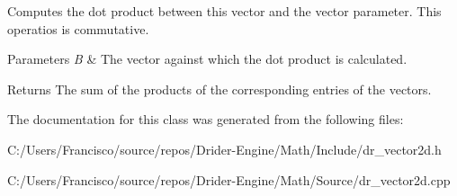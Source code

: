Computes the dot product between this vector and the vector parameter. This operatios is commutative.


\begin{DoxyParams}{Parameters}
{\em B} & The vector against which the dot product is calculated.\\
\hline
\end{DoxyParams}
\begin{DoxyReturn}{Returns}
The sum of the products of the corresponding entries of the vectors. 
\end{DoxyReturn}


The documentation for this class was generated from the following files\+:\begin{DoxyCompactItemize}
\item 
C\+:/\+Users/\+Francisco/source/repos/\+Drider-\/\+Engine/\+Math/\+Include/dr\+\_\+vector2d.\+h\item 
C\+:/\+Users/\+Francisco/source/repos/\+Drider-\/\+Engine/\+Math/\+Source/dr\+\_\+vector2d.\+cpp\end{DoxyCompactItemize}
